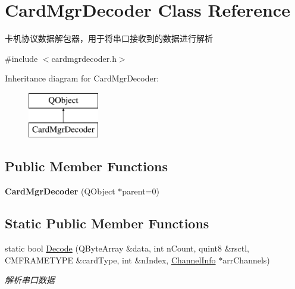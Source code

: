 \hypertarget{class_card_mgr_decoder}{\section{Card\-Mgr\-Decoder Class Reference}
\label{class_card_mgr_decoder}
}


卡机协议数据解包器，用于将串口接收到的数据进行解析  




{\ttfamily \#include $<$cardmgrdecoder.\-h$>$}

Inheritance diagram for Card\-Mgr\-Decoder\-:\begin{figure}[H]
\begin{center}
\leavevmode
\includegraphics[height=2.000000cm]{class_card_mgr_decoder}
\end{center}
\end{figure}
\subsection*{Public Member Functions}
\begin{DoxyCompactItemize}
\item 
\hypertarget{class_card_mgr_decoder_a8d64fe1e714f0bc2c7be352d224f9206}{{\bfseries Card\-Mgr\-Decoder} (Q\-Object $\ast$parent=0)}\label{class_card_mgr_decoder_a8d64fe1e714f0bc2c7be352d224f9206}

\end{DoxyCompactItemize}
\subsection*{Static Public Member Functions}
\begin{DoxyCompactItemize}
\item 
static bool \hyperlink{class_card_mgr_decoder_aabac70b6795845e74e8ba80fdd386a39}{Decode} (Q\-Byte\-Array \&data, int n\-Count, quint8 \&rsctl, C\-M\-F\-R\-A\-M\-E\-T\-Y\-P\-E \&card\-Type, int \&n\-Index, \hyperlink{struct_channel_info}{Channel\-Info} $\ast$arr\-Channels)
\begin{DoxyCompactList}\small\item\em 解析串口数据 \end{DoxyCompactList}\end{DoxyCompactItemize}


